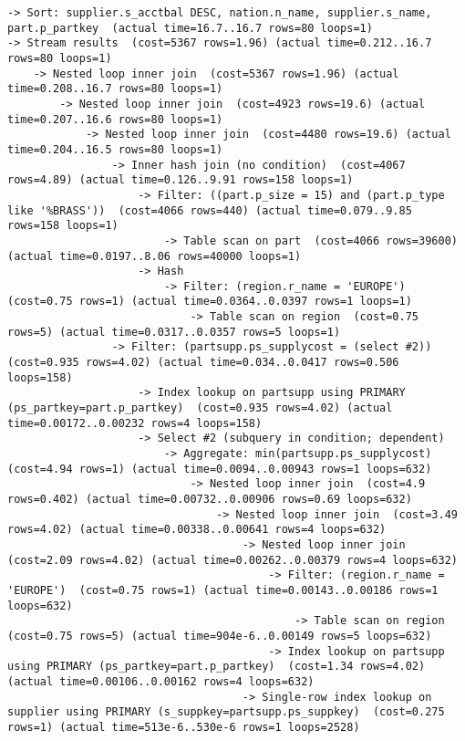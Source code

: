 \documentclass{article}
\begin{document}
\begin{lstlisting}
-> Sort: supplier.s_acctbal DESC, nation.n_name, supplier.s_name, part.p_partkey  (actual time=16.7..16.7 rows=80 loops=1)
-> Stream results  (cost=5367 rows=1.96) (actual time=0.212..16.7 rows=80 loops=1)
    -> Nested loop inner join  (cost=5367 rows=1.96) (actual time=0.208..16.7 rows=80 loops=1)
        -> Nested loop inner join  (cost=4923 rows=19.6) (actual time=0.207..16.6 rows=80 loops=1)
            -> Nested loop inner join  (cost=4480 rows=19.6) (actual time=0.204..16.5 rows=80 loops=1)
                -> Inner hash join (no condition)  (cost=4067 rows=4.89) (actual time=0.126..9.91 rows=158 loops=1)
                    -> Filter: ((part.p_size = 15) and (part.p_type like '%BRASS'))  (cost=4066 rows=440) (actual time=0.079..9.85 rows=158 loops=1)
                        -> Table scan on part  (cost=4066 rows=39600) (actual time=0.0197..8.06 rows=40000 loops=1)
                    -> Hash
                        -> Filter: (region.r_name = 'EUROPE')  (cost=0.75 rows=1) (actual time=0.0364..0.0397 rows=1 loops=1)
                            -> Table scan on region  (cost=0.75 rows=5) (actual time=0.0317..0.0357 rows=5 loops=1)
                -> Filter: (partsupp.ps_supplycost = (select #2))  (cost=0.935 rows=4.02) (actual time=0.034..0.0417 rows=0.506 loops=158)
                    -> Index lookup on partsupp using PRIMARY (ps_partkey=part.p_partkey)  (cost=0.935 rows=4.02) (actual time=0.00172..0.00232 rows=4 loops=158)
                    -> Select #2 (subquery in condition; dependent)
                        -> Aggregate: min(partsupp.ps_supplycost)  (cost=4.94 rows=1) (actual time=0.0094..0.00943 rows=1 loops=632)
                            -> Nested loop inner join  (cost=4.9 rows=0.402) (actual time=0.00732..0.00906 rows=0.69 loops=632)
                                -> Nested loop inner join  (cost=3.49 rows=4.02) (actual time=0.00338..0.00641 rows=4 loops=632)
                                    -> Nested loop inner join  (cost=2.09 rows=4.02) (actual time=0.00262..0.00379 rows=4 loops=632)
                                        -> Filter: (region.r_name = 'EUROPE')  (cost=0.75 rows=1) (actual time=0.00143..0.00186 rows=1 loops=632)
                                            -> Table scan on region  (cost=0.75 rows=5) (actual time=904e-6..0.00149 rows=5 loops=632)
                                        -> Index lookup on partsupp using PRIMARY (ps_partkey=part.p_partkey)  (cost=1.34 rows=4.02) (actual time=0.00106..0.00162 rows=4 loops=632)
                                    -> Single-row index lookup on supplier using PRIMARY (s_suppkey=partsupp.ps_suppkey)  (cost=0.275 rows=1) (actual time=513e-6..530e-6 rows=1 loops=2528)

\end{lstlisting}
\end{document}

